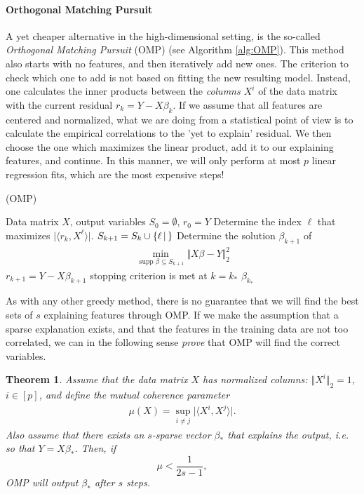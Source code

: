 \documentclass{article}
\DeclareMathOperator{\supp}{\mathrm{supp}}
\newcommand{\sprod}[1]{\langle #1 \rangle}
\newcommand{\sse}{\subseteq}
\newtheorem{theorem}{Theorem}
\newcommand{\set}[2]{\{ #1 \, \vert \, #2\}}
\newcommand{\abs}[1]{\vert #1 \vert}
\newcommand{\norm}[1]{\Vert #1 \Vert}
\begin{document}
\paragraph{Orthogonal Matching Pursuit}
A yet cheaper alternative in the high-dimensional setting, is the so-called \emph{Orthogonal Matching Pursuit} (OMP) (see Algorithm \ref{alg:OMP}). This method also starts with no features, and then iteratively add new ones. The criterion to check which one to add is not based on fitting the new resulting model. Instead, one calculates the inner products between the \emph{columns $X^i$} of the data matrix with the current residual $r_k = Y-X\beta_k$. If we assume that all features are centered and normalized, what we are doing from a statistical point of view is to calculate the empirical correlations to the 'yet to explain' residual. We then choose the one which maximizes the linear product, add it to our explaining features, and continue. In this manner, we will only perform at most $p$ linear regression fits, which are the most expensive steps!

\begin{algorithm}[tb]      
	\caption{(OMP)} 
	\label{alg:OMP}
	\begin{algorithmic} [1]
 		\REQUIRE Data matrix $X$,  output variables
 		\STATE $S_0=\emptyset$, $r_0 = Y$
 		\REPEAT
 			\STATE Determine the index $\ell$ that maximizes $\abs{\sprod{r_k, X^\ell}}$.
            \STATE $S_{k+1} = S_k \cup \set{\ell}$
            \STATE Determine the solution $\beta_{k+1}$ of 
            \begin{align}
                \min_{\supp \beta \sse S_{k+1}} \norm{X\beta - Y}_2^2 \label{eq:ompprob}
            \end{align}
            \STATE $r_{k+1} = Y-X\beta_{k+1}$
 		\UNTIL stopping criterion is met at $k= k_*$
 		\RETURN $\beta_{k_*}$
	\end{algorithmic}
\end{algorithm}

As with any other greedy method, there is no guarantee that we will find the best sets of $s$ explaining features through OMP. If we make the assumption that a sparse explanation exists, and that the features in the training data are not too correlated, we can in the following sense \emph{prove} that OMP will find the correct variables.

\begin{theorem}
    Assume that the data matrix $X$ has normalized columns: $\norm{X^i}_2=1$, $i\in [p]$, and define the \emph{mutual coherence} parameter
    \begin{align*}
        \mu(X) = \sup_{i \neq j } \abs{\sprod{X^i,X^j}}.
    \end{align*}
    Also assume that there exists an $s$-sparse vector $\beta_*$ that explains the output, i.e. so that $Y=X\beta_*$. Then, if $$\mu < \frac{1}{2s-1},$$ OMP will output $\beta_*$ after $s$ steps. 
\end{theorem}
\end{document}
